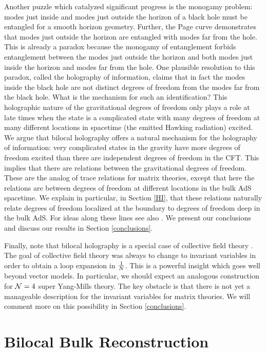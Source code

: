 \documentclass[a4paper,12pt]{article}
\begin{document}
Another puzzle which catalyzed significant progress is the monogamy problem: modes just inside and modes
just outside the horizon of a black hole must be entangled for a smooth horizon geometry.
Further, the Page curve demonstrates that modes just outside the horizon are entangled with modes far from the hole.
This is already a paradox because the monogamy of entanglement forbids entanglement between the modes just outside 
the horizon and both modes just inside the horizon and modes far from the hole.
One plausible resolution to this paradox, called the holography of information, claims that in fact the modes inside the 
black hole are not distinct degrees of freedom from the modes far from the black hole.
What is the mechanism for such an identification?
This holographic nature of the gravitational degrees of freedom only plays a role at late times when the state is a complicated 
state with many degrees of freedom at many different locations in spacetime (the emitted Hawking radiation) excited.
We argue that bilocal holography offers a natural mechanism for the holography of information: very complicated states
in the gravity have more degrees of freedom excited than there are independent degrees of freedom in the CFT.
This implies that there are relations between the gravitational degrees of freedom.
These are the analog of trace relations for matrix theories, except that here the relations are between degrees of freedom
at different locations in the bulk AdS spacetime.
We explain in particular, in Section \ref{HI}, that these relations naturally relate degrees of freedom localized at the 
boundary to degrees of freedom deep in the bulk AdS.
For ideas along these lines see also \cite{Jevicki:1996wu,Jevicki:1998rr,Aharony:2020omh}.
We present our conclusions and discuss our results in Section \ref{conclusions}.

Finally, note that bilocal holography is a special case of collective field theory \cite{Jevicki:1979mb,Jevicki:1980zg}.
The goal of collective field theory was always to change to invariant variables in order to obtain a loop expansion in 
${1\over N}$. 
This is a powerful insight which goes well beyond vector models.
In particular, we should expect an analogous construction for ${\cal N}=4$ super Yang-Mills theory.
The key obstacle is that there is not yet a manageable description for the invariant variables for matrix theories.
We will comment more on this possibility in Section \ref{conclusions}.


\section{Bilocal Bulk Reconstruction}\label{bulkreconstruction}
\end{document}
